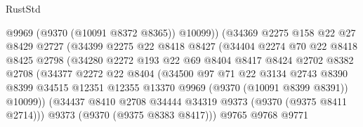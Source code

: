\begin{lexlean}{RustStd}
\begin{coremodule}
{\begin{coremodule}
{{{{{{{{{{{{{{{{{{{{{{{{{{{{{{{{{{{{{{{                              @9969
                              (@9370 (@10091 @8372 @8365))
                              @10099))
                          (@34369
                            @2275
                            @158
                            @22
                            @27
                            @8429
                            @2727
                            (@34399
                              @2275
                              @22
                              @8418
                              @8427
                              (@34404
                                @2274
                                @70
                                @22
                                @8418
                                @8425
                                @2798
                                (@34280
                                  @2272
                                  @193
                                  @22
                                  @69
                                  @8404
                                  @8417
                                  @8424
                                  @2702
                                  @8382
                                  @2708
                                  (@34377
                                    @2272
                                    @22
                                    @8404
                                    (@34500
                                      @97
                                      @71
                                      @22
                                      @3134
                                      @2743
                                      @8390
                                      @8399
                                      @34515
                                      @12351
                                      @12355
                                      @13370
                                      @9969
                                      (@9370 (@10091 @8399 @8391))
                                      @10099))
                                  (@34437
                                    @8410
                                    @2708
                                    @34444
                                    @34319
                                    @9373
                                    (@9370 (@9375 @8411 @2714)))
                                  @9373
                                  (@9370 (@9375 @8383 @8417)))
                                @9765
                                @9768
                                @9771
}}}}}}}}}}}}}}}}}}}}}}}}}}}}}}}}}}}}}}}
\end{coremodule}}
\end{coremodule}
\end{lexlean}

